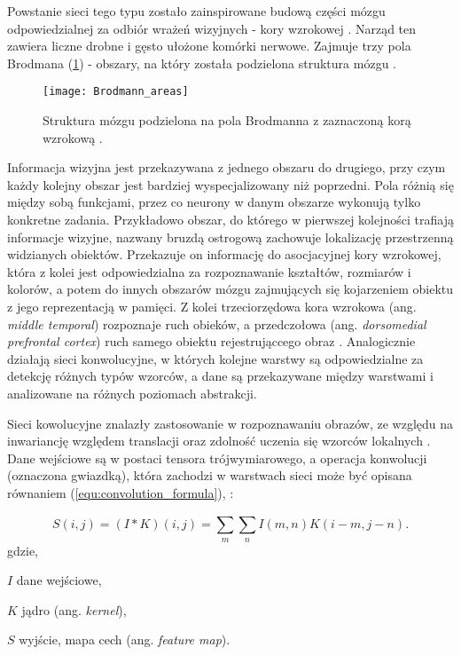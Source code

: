 {\parindent0pt %
Powstanie sieci tego typu zostało zainspirowane budową części mózgu odpowiedzialnej za odbiór wrażeń wizyjnych - kory wzrokowej \cite{Matsugu2003SubjectIF}. Narząd ten zawiera liczne drobne i gęsto ułożone komórki nerwowe. Zajmuje trzy pola Brodmana (\ref{fig:brodmann_areas}) - obszary, na który została podzielona struktura mózgu \cite{Brodmann1985VergleichendeLD}. 

\begin{figure}[h]
	\centering
	\centering
		\texttt{[image: Brodmann\_areas]}	
	\caption{Struktura mózgu podzielona na pola Brodmanna z zaznaczoną korą wzrokową \cite{brodmann_areas}.}
	\label{fig:brodmann_areas}
\end{figure}

Informacja wizyjna jest przekazywana z jednego obszaru do drugiego, przy czym każdy kolejny obszar jest bardziej wyspecjalizowany niż poprzedni. Pola różnią się między sobą funkcjami, przez co neurony w danym obszarze wykonują tylko konkretne zadania. Przykładowo obszar, do którego w pierwszej kolejności trafiają informacje wizyjne, nazwany bruzdą ostrogową zachowuje lokalizację przestrzenną widzianych obiektów. Przekazuje on informację do asocjacyjnej kory wzrokowej, która z kolei jest odpowiedzialna za rozpoznawanie kształtów, rozmiarów i kolorów, a potem do innych obszarów mózgu zajmujących się kojarzeniem obiektu z jego reprezentacją w pamięci. Z kolei trzeciorzędowa kora wzrokowa (ang. \textit{middle temporal}) rozpoznaje ruch obieków, a przedczołowa (ang. \textit{dorsomedial prefrontal cortex}) ruch samego obiektu rejestrująccego obraz \cite{cnn_website}. Analogicznie działają sieci konwolucyjne, w których kolejne warstwy są odpowiedzialne za detekcję różnych typów wzorców, a dane są przekazywane między warstwami i analizowane na różnych poziomach abstrakcji.

Sieci kowolucyjne znalazły zastosowanie w rozpoznawaniu obrazów, ze względu na inwariancję względem translacji oraz zdolność uczenia się wzorców lokalnych \cite{Chollet2017DeepLW}. Dane wejściowe są w postaci tensora trójwymiarowego, a operacja konwolucji (oznaczona gwiazdką), która zachodzi w warstwach sieci może być opisana równaniem (\ref{equ:convolution_formula}), \cite{deep_learning}:

\begin{equation}
S(i,j) = (I * K)(i,j) = \sum_{m}^{}\sum_{n}^{} I(m,n)K(i-m,j-n).
\label{equ:convolution_formula}
\end{equation}
gdzie,
\begin{eqwhere}[2cm]
	\item[$I$] dane wejściowe,
	\item[$K$] jądro (ang. \textit{kernel}),
	\item[$S$] wyjście, mapa cech (ang. \textit{feature map}).
\end{eqwhere}
}

